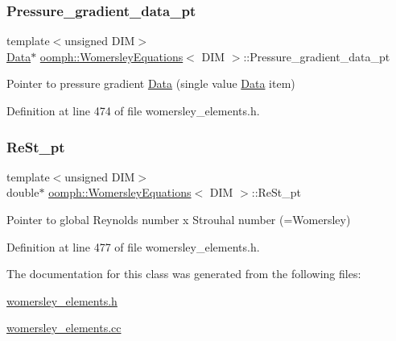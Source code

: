 \subsubsection{\texorpdfstring{Pressure\+\_\+gradient\+\_\+data\+\_\+pt}{Pressure\_gradient\_data\_pt}}
{\footnotesize\ttfamily template$<$unsigned D\+IM$>$ \\
\hyperlink{classoomph_1_1Data}{Data}$\ast$ \hyperlink{classoomph_1_1WomersleyEquations}{oomph\+::\+Womersley\+Equations}$<$ D\+IM $>$\+::Pressure\+\_\+gradient\+\_\+data\+\_\+pt\hspace{0.3cm}{\ttfamily [protected]}}



Pointer to pressure gradient \hyperlink{classoomph_1_1Data}{Data} (single value \hyperlink{classoomph_1_1Data}{Data} item) 



Definition at line 474 of file womersley\+\_\+elements.\+h.

\mbox{\label{classoomph_1_1WomersleyEquations_af6aa8745284573bf740816c394fa5437}} 
\subsubsection{\texorpdfstring{Re\+St\+\_\+pt}{ReSt\_pt}}
{\footnotesize\ttfamily template$<$unsigned D\+IM$>$ \\
double$\ast$ \hyperlink{classoomph_1_1WomersleyEquations}{oomph\+::\+Womersley\+Equations}$<$ D\+IM $>$\+::Re\+St\+\_\+pt\hspace{0.3cm}{\ttfamily [protected]}}



Pointer to global Reynolds number x Strouhal number (=Womersley) 



Definition at line 477 of file womersley\+\_\+elements.\+h.



The documentation for this class was generated from the following files\+:\begin{DoxyCompactItemize}
\item 
\hyperlink{womersley__elements_8h}{womersley\+\_\+elements.\+h}\item 
\hyperlink{womersley__elements_8cc}{womersley\+\_\+elements.\+cc}\end{DoxyCompactItemize}

